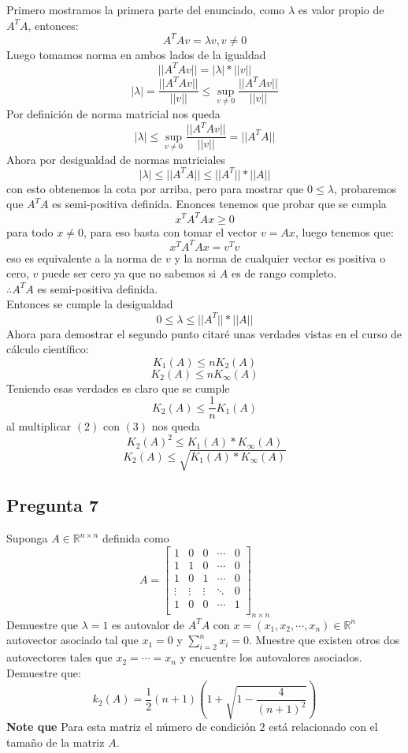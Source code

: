 \documentclass{article}
\def\R{\mbox{\(\mathbb{R}\)}}
\begin{document}
Primero mostramos la primera parte del enunciado, como $\lambda$ es valor propio de $A^{T}A$, entonces:
$$A^{T}Av = \lambda v, v\neq 0$$
Luego tomamos norma en ambos lados de la igualdad
$$||A^{T}Av|| = |\lambda|* ||v||$$
$$|\lambda|=\frac{||A^{T}Av||}{||v||}\leq \sup_{v\neq 0} \frac{||A^{T}Av||}{||v||}$$
Por definición de norma matricial nos queda
$$|\lambda|\leq \sup_{v\neq 0} \frac{||A^{T}Av||}{||v||}= ||A^{T}A||$$
Ahora por desigualdad de normas matriciales
$$|\lambda|\leq ||A^{T}A||\leq ||A^{T}||*||A||$$
con esto obtenemos la cota por arriba, pero para mostrar que $0\leq\lambda$, probaremos que $A^{T}A$ es semi-positiva definida.
Enonces tenemos que probar que se cumpla
$$ x^{T}A^{T}Ax\geq 0$$
para todo $x\neq 0$, para eso basta con tomar el vector $v = Ax$, luego tenemos que:
$$ x^{T}A^{T}Ax=v^{T}v$$
eso es equivalente a la norma de $v$ y la norma de cualquier vector es positiva o cero, $v$ puede ser cero ya que no sabemos si $A$ es de rango completo.\\
$\therefore A^{T}A$ es semi-positiva definida.\\
Entonces se cumple la desigualdad
$$0\leq \lambda\leq ||A^{T}||*||A||$$
Ahora para demostrar el segundo punto citaré unas verdades vistas en el curso de cálculo científico:
\begin{equation}
 K_1(A)\leq nK_2(A)
\end{equation}
\begin{equation}
K_2(A)\leq nK_{\infty}(A)
\end{equation}
Teniendo esas verdades es claro que se cumple
\begin{equation}
K_2(A)\leq \frac{1}{n}K_1(A)
\end{equation}
al multiplicar $(2)$ con $(3)$
nos queda 
$$K_2(A)^{2}\leq K_1(A)*K_{\infty}(A)$$
$$K_2(A)\leq \sqrt{K_1(A)*K_{\infty}(A)}$$
\subsection*{Pregunta 7}
Suponga $A \in \mathbb{R}^{n\times n}$ definida como
$$A =
\begin{bmatrix}
1&0&0&\cdots &0\\
1&1&0&\cdots &0\\
1&0&1&\cdots &0\\
\vdots&\vdots&\vdots&\ddots& 0\\
1&0&0&\cdots &1\\
\end{bmatrix}_{n\times n}
$$
Demuestre que $\lambda =1$ es autovalor de $A^{T}A$ con $x = (x_1, x_2, \cdots, x_n)\in \R^n$ autovector asociado tal que $x_1 = 0$ y $\sum_{i=2}^{n}x_i = 0$. Muestre que existen otros dos autovectores tales que $x_2 = \cdots = x_n$ y encuentre los autovalores asociados. Demuestre que:
$$ k_2(A) = \frac{1}{2}(n+1)\left(1+\sqrt{1-\frac{4}{(n+1)^{2}}}\right)$$
{\bf Note que} Para esta matriz el número de condición $2$ está relacionado con el tamaño de la matriz $A$.\\
\end{document}

